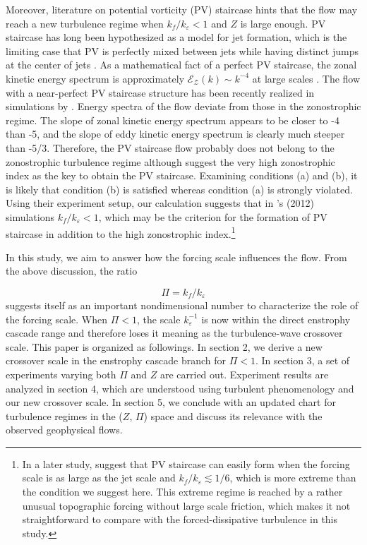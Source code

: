 \documentclass{ametsoc}
\begin{document}
Moreover, literature on potential vorticity (PV) staircase hints that
the flow may reach a new turbulence regime when $k_{f}/k_{\varepsilon}<1$
and $Z$ is large enough. PV staircase has long been hypothesized
as a model for jet formation, which is the limiting case that PV is
perfectly mixed between jets while having distinct jumps at the center
of jets \citep{Marcus1993,Marcus1998,Dunkerton2008,Dritschel2008}.
As a mathematical fact of a perfect PV staircase, the zonal kinetic
energy spectrum is approximately $\mathcal{E_{Z}}(k)\sim k^{-4}$
at large scales \citep{Saffman1971,Danilov2004a}. The flow with a
near-perfect PV staircase structure has been recently realized in
simulations by \citet{Scott2012}. Energy spectra of the flow deviate
from those in the zonostrophic regime. The slope of zonal kinetic
energy spectrum appears to be closer to -4 than -5, and the slope
of eddy kinetic energy spectrum is clearly much steeper than -5/3.
Therefore, the PV staircase flow probably does not belong to the zonostrophic
turbulence regime although \citet{Scott2012} suggest the very high
zonostrophic index as the key to obtain the PV staircase. Examining
conditions (a) and (b), it is likely that condition (b) is satisfied
whereas condition (a) is strongly violated. Using their experiment
setup, our calculation suggests that in \citeauthor{Scott2012}'s
(2012) simulations $k_{f}/k_{\varepsilon}<1$, which may be the criterion
for the formation of PV staircase in addition to the high zonostrophic
index.\footnote{In a later study, \citet{Scott2012a} suggest that PV staircase can
easily form when the forcing scale is as large as the jet scale and
$k_{f}/k_{\varepsilon}\apprle1/6$, which is more extreme than the
condition we suggest here. This extreme regime is reached by a rather
unusual topographic forcing without large scale friction, which makes
it not straightforward to compare with the forced-dissipative turbulence
in this study.} 

In this study, we aim to answer how the forcing scale influences the
flow. From the above discussion, the ratio

\begin{equation}
\Pi=k_{f}/k_{\varepsilon}\label{eq:def_Pi_index}
\end{equation}
suggests itself as an important nondimensional number to characterize
the role of the forcing scale. When $\Pi<1$, the scale $k_{\varepsilon}^{-1}$
is now within the direct enstrophy cascade range and therefore loses
it meaning as the turbulence-wave crossover scale. This paper is organized
as followings. In section 2, we derive a new crossover scale in the
enstrophy cascade branch for $\Pi<1$. In section 3, a set of experiments
varying both $\Pi$ and $Z$ are carried out. Experiment results are
analyzed in section 4, which are understood using turbulent phenomenology
and our new crossover scale. In section 5, we conclude with an updated
chart for turbulence regimes in the ($Z$, $\Pi$) space and discuss
its relevance with the observed geophysical flows.
\end{document}
